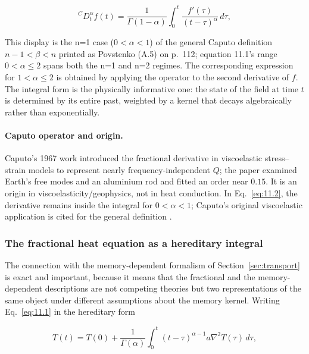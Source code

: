\begin{equation}
{}^C D_t^\alpha f(t) = \frac{1}{\Gamma(1-\alpha)}\int_0^t \frac{f'(\tau)}{(t-\tau)^{\alpha}}\, d\tau ,
\label{eq:11.2}
\end{equation}

This display is the n=1 case ($0<\alpha<1$) of the general Caputo definition $n-1<\beta<n$ printed as Povstenko (A.5) on p.~112; equation 11.1's range $0<\alpha\leq2$ spans both the n=1 and n=2 regimes. The corresponding expression for $1 < \alpha \leq 2$ is obtained by applying the operator to the second derivative of $f$. The integral form is the physically informative one: the state of the field at time $t$ is determined by its entire past, weighted by a kernel that decays algebraically rather than exponentially.

\paragraph{Caputo operator and origin.} Caputo's 1967 work introduced the fractional derivative in viscoelastic stress--strain models to represent nearly frequency-independent $Q$; the paper examined Earth's free modes and an aluminium rod and fitted an order near $0.15$. It is an origin in viscoelasticity/geophysics, not in heat conduction. In Eq.~\eqref{eq:11.2}, the derivative remains inside the integral for $0<\alpha<1$; Caputo's original viscoelastic application is cited for the general definition \cite{Caputo1967}.

\subsubsection{The fractional heat equation as a hereditary integral}

The connection with the memory-dependent formalism of Section~\ref{sec:transport} is exact and important, because it means that the fractional and the memory-dependent descriptions are not competing theories but two representations of the same object under different assumptions about the memory kernel. Writing Eq.~\eqref{eq:11.1} in the hereditary form

\begin{equation}
T(t) = T(0) + \frac{1}{\Gamma(\alpha)}\int_0^t (t-\tau)^{\alpha-1} a \nabla^2 T(\tau)\, d\tau ,
\label{eq:11.3}
\end{equation}

